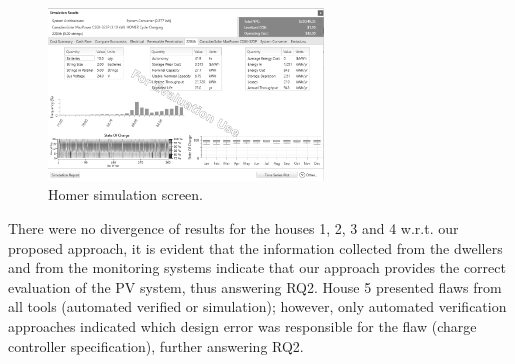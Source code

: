 \documentclass[review]{elsarticle}
\begin{document}
\begin{figure}[h]
\includegraphics[width=0.65\textwidth]{homer.png}
\centering
\caption{Homer simulation screen.}
\label{fig:homerscreen}
\end{figure}
%
There were no divergence of results for the houses 1, 2, 3 and 4 w.r.t. our proposed approach, it is evident that the information collected from the dwellers and from the monitoring systems indicate that our approach provides the correct evaluation of the PV system, thus answering RQ2. House 5 presented flaws from all tools (automated verified or simulation); however, only automated verification approaches indicated which design error was responsible for the flaw (charge controller specification), further answering RQ2.
%
%
%
\end{document}
